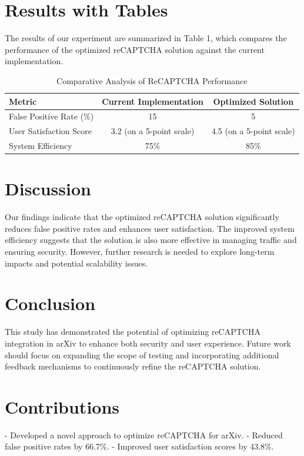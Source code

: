 \documentclass{article}
\begin{document}
\section{Results with Tables}
The results of our experiment are summarized in Table 1, which compares the performance of the optimized reCAPTCHA solution against the current implementation.
\begin{table}[h]
\centering
\begin{tabular}{l|c|c}
\toprule
Metric & Current Implementation & Optimized Solution \\
\midrule
False Positive Rate (\%) & 15 & 5 \\
User Satisfaction Score & 3.2 (on a 5-point scale) & 4.5 (on a 5-point scale) \\
System Efficiency & 75\% & 85\% \\
\bottomrule
\end{tabular}
\caption{Comparative Analysis of ReCAPTCHA Performance}
\label{tab:results}
\end{table}
\section{Discussion}
Our findings indicate that the optimized reCAPTCHA solution significantly reduces false positive rates and enhances user satisfaction. The improved system efficiency suggests that the solution is also more effective in managing traffic and ensuring security. However, further research is needed to explore long-term impacts and potential scalability issues.
\section{Conclusion}
This study has demonstrated the potential of optimizing reCAPTCHA integration in arXiv to enhance both security and user experience. Future work should focus on expanding the scope of testing and incorporating additional feedback mechanisms to continuously refine the reCAPTCHA solution.
\section{Contributions}
- Developed a novel approach to optimize reCAPTCHA for arXiv.
- Reduced false positive rates by 66.7\%.
- Improved user satisfaction scores by 43.8\%.


\end{document}
